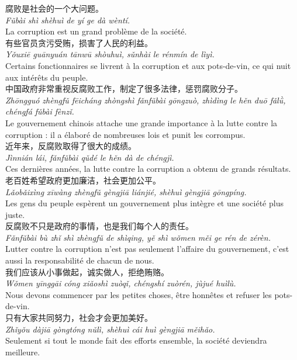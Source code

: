 \documentclass[11pt]{article}
\begin{document}
\begin{textebox}
腐败是社会的一个大问题。\\
\emph{Fǔbài shì shèhuì de yí ge dà wèntí.}\\
La corruption est un grand problème de la société.\\[4pt]
有些官员贪污受贿，损害了人民的利益。\\
\emph{Yǒuxiē guānyuán tānwū shòuhuì, sǔnhài le rénmín de lìyì.}\\
Certains fonctionnaires se livrent à la corruption et aux pots-de-vin, ce qui nuit aux intérêts du peuple.\\[4pt]
中国政府非常重视反腐败工作，制定了很多法律，惩罚腐败分子。\\
\emph{Zhōngguó zhèngfǔ fēicháng zhòngshì fǎnfǔbài gōngzuò, zhìdìng le hěn duō fǎlǜ, chéngfá fǔbài fènzǐ.}\\
Le gouvernement chinois attache une grande importance à la lutte contre la corruption : il a élaboré de nombreuses lois et punit les corrompus.\\[4pt]
近年来，反腐败取得了很大的成绩。\\
\emph{Jìnnián lái, fǎnfǔbài qǔdé le hěn dà de chéngjì.}\\
Ces dernières années, la lutte contre la corruption a obtenu de grands résultats.\\[4pt]
老百姓希望政府更加廉洁，社会更加公平。\\
\emph{Lǎobǎixìng xīwàng zhèngfǔ gèngjiā liánjié, shèhuì gèngjiā gōngpíng.}\\
Les gens du peuple espèrent un gouvernement plus intègre et une société plus juste.\\[4pt]
反腐败不只是政府的事情，也是我们每个人的责任。\\
\emph{Fǎnfǔbài bù zhǐ shì zhèngfǔ de shìqing, yě shì wǒmen měi ge rén de zérèn.}\\
Lutter contre la corruption n'est pas seulement l'affaire du gouvernement, c'est aussi la responsabilité de chacun de nous.\\[4pt]
我们应该从小事做起，诚实做人，拒绝贿赂。\\
\emph{Wǒmen yīnggāi cóng xiǎoshì zuòqǐ, chéngshí zuòrén, jùjué huìlù.}\\
Nous devons commencer par les petites choses, être honnêtes et refuser les pots-de-vin.\\[4pt]
只有大家共同努力，社会才会更加美好。\\
\emph{Zhǐyǒu dàjiā gòngtóng nǔlì, shèhuì cái huì gèngjiā měihǎo.}\\
Seulement si tout le monde fait des efforts ensemble, la société deviendra meilleure.
\end{textebox}
\end{document}
